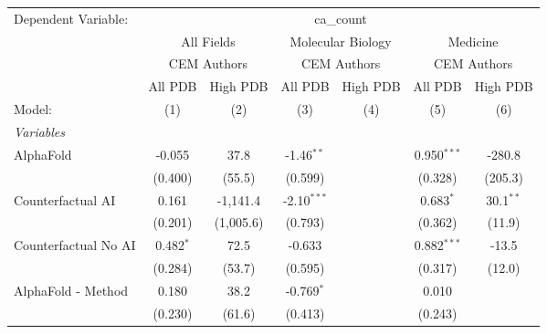 \begingroup
\centering
\begin{tabular}{lcccccc}
   \tabularnewline \midrule \midrule
   Dependent Variable: & \multicolumn{6}{c}{ca\_count}\\
 & \multicolumn{2}{c}{All Fields} & \multicolumn{2}{c}{Molecular Biology} & \multicolumn{2}{c}{Medicine} \\
\cmidrule(lr){2-3} \cmidrule(lr){4-5} \cmidrule(lr){6-7}
 & \multicolumn{2}{c}{CEM Authors} & \multicolumn{2}{c}{CEM Authors} & \multicolumn{2}{c}{CEM Authors} \\
\cmidrule(lr){2-3} \cmidrule(lr){4-5} \cmidrule(lr){6-7}
 & \multicolumn{1}{c}{All PDB} & \multicolumn{1}{c}{High PDB} & \multicolumn{1}{c}{All PDB} & \multicolumn{1}{c}{High PDB} & \multicolumn{1}{c}{All PDB} & \multicolumn{1}{c}{High PDB} \\
\cmidrule(lr){2-2} \cmidrule(lr){3-3} \cmidrule(lr){4-4} \cmidrule(lr){5-5} \cmidrule(lr){6-6} \cmidrule(lr){7-7}
   Model:                                                     & (1)         & (2)          & (3)           & (4)   & (5)           & (6)\\  
   \midrule
   \emph{Variables}\\
   AlphaFold                                                  & -0.055      & 37.8         & -1.46$^{**}$  &       & 0.950$^{***}$ & -280.8\\   
                                                              & (0.400)     & (55.5)       & (0.599)       &       & (0.328)       & (205.3)\\   
   Counterfactual AI                                          & 0.161       & -1,141.4     & -2.10$^{***}$ &       & 0.683$^{*}$   & 30.1$^{**}$\\   
                                                              & (0.201)     & (1,005.6)    & (0.793)       &       & (0.362)       & (11.9)\\   
   Counterfactual No AI                                       & 0.482$^{*}$ & 72.5         & -0.633        &       & 0.882$^{***}$ & -13.5\\   
                                                              & (0.284)     & (53.7)       & (0.595)       &       & (0.317)       & (12.0)\\   
   AlphaFold - Method                                         & 0.180       & 38.2         & -0.769$^{*}$  &       & 0.010         &   \\   
                                                              & (0.230)     & (61.6)       & (0.413)       &       & (0.243)       &   \\   

\end{tabular}
